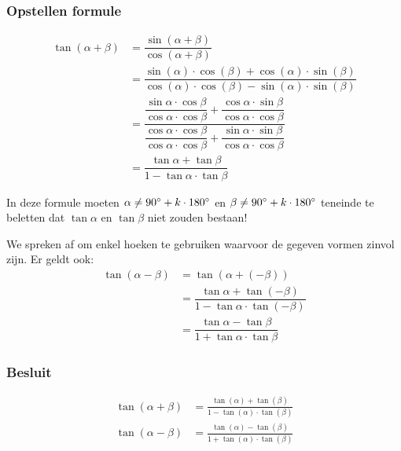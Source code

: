 \documentclass[a4paper,12pt]{article}
\begin{document}
\begin{theorie}
\subsubsection*{Opstellen formule}
\begin{align*}
  \tan(\alpha + \beta) &= \dfrac{\sin(\alpha + \beta)}{\cos(\alpha+\beta)}\\
                       &= \dfrac{\sin(\alpha)\cdot \cos(\beta)+\cos(\alpha)\cdot \sin(\beta)}{\cos(\alpha)\cdot \cos(\beta)-\sin(\alpha)\cdot \sin(\beta)}\\
                       &= \dfrac{\dfrac{\sin\alpha\cdot\cos\beta}{\cos\alpha\cdot\cos\beta}+\dfrac{\cos\alpha\cdot\sin\beta}{\cos\alpha\cdot\cos\beta}}{\dfrac{\cos\alpha\cdot\cos\beta}{\cos\alpha\cdot\cos\beta}+\dfrac{\sin\alpha\cdot\sin\beta}{\cos\alpha\cdot\cos\beta}}\\
                       &= \dfrac{\tan\alpha+\tan\beta}{1-\tan\alpha\cdot\tan\beta}
\end{align*}

In deze formule moeten $\alpha\neq 90^\circ + k\cdot 180^\circ$ en $\beta \neq 90^\circ + k\cdot 180^\circ$ teneinde te beletten dat $\tan\alpha$ en $\tan\beta$ niet zouden bestaan!

We spreken af om enkel hoeken te gebruiken waarvoor de gegeven vormen zinvol zijn. Er geldt ook:
\begin{align*}
  \tan(\alpha - \beta) &= \tan(\alpha + (-\beta))\\
                       &= \dfrac{\tan\alpha + \tan(-\beta)}{1-\tan\alpha\cdot\tan(-\beta)}\\
                       &= \dfrac{\tan\alpha - \tan\beta}{1+\tan\alpha\cdot\tan\beta}
\end{align*}

\subsubsection*{Besluit}
\begin{align*}
  \tan(\alpha + \beta)&=\frac{\tan(\alpha)+\tan(\beta)}{1-\tan(\alpha)\cdot\tan(\beta)}\\
  \tan(\alpha - \beta)&=\frac{\tan(\alpha)-\tan(\beta)}{1+\tan(\alpha)\cdot\tan(\beta)}
\end{align*}

\pagebreak

\end{theorie}
\end{document}
